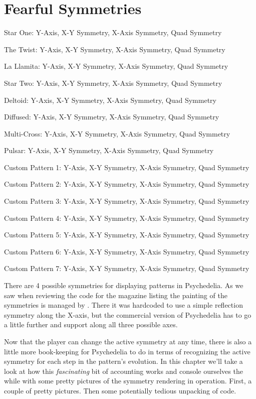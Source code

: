 \chapter{Fearful Symmetries} 
\label{sec:symmetries}
\lstset{style=6502Style}

\newcommand\addItem[2]%
{
  \expandafter\def\csname row:#1\endcsname{#2}%
}

\newcommand\showItem[1]%
{\expandafter\csname row:#1\endcsname}


\newcommand\getItem[1]%
{\noindent
  \text{\showItem{#1}}
  \par
}
\addItem{0}{Star One: Y-Axis, X-Y Symmetry, X-Axis Symmetry, Quad Symmetry}
\addItem{1}{The Twist: Y-Axis, X-Y Symmetry, X-Axis Symmetry, Quad Symmetry}
\addItem{2}{La Llamita: Y-Axis, X-Y Symmetry, X-Axis Symmetry, Quad Symmetry}
\addItem{3}{Star Two: Y-Axis, X-Y Symmetry, X-Axis Symmetry, Quad Symmetry}
\addItem{4}{Deltoid: Y-Axis, X-Y Symmetry, X-Axis Symmetry, Quad Symmetry}
\addItem{5}{Diffused: Y-Axis, X-Y Symmetry, X-Axis Symmetry, Quad Symmetry}
\addItem{6}{Multi-Cross: Y-Axis, X-Y Symmetry, X-Axis Symmetry, Quad Symmetry}
\addItem{7}{Pulsar: Y-Axis, X-Y Symmetry, X-Axis Symmetry, Quad Symmetry}
\addItem{8}{Custom Pattern 1: Y-Axis, X-Y Symmetry, X-Axis Symmetry, Quad Symmetry}
\addItem{9}{Custom Pattern 2: Y-Axis, X-Y Symmetry, X-Axis Symmetry, Quad Symmetry}
\addItem{10}{Custom Pattern 3: Y-Axis, X-Y Symmetry, X-Axis Symmetry, Quad Symmetry}
\addItem{11}{Custom Pattern 4: Y-Axis, X-Y Symmetry, X-Axis Symmetry, Quad Symmetry}
\addItem{12}{Custom Pattern 5: Y-Axis, X-Y Symmetry, X-Axis Symmetry, Quad Symmetry}
\addItem{13}{Custom Pattern 6: Y-Axis, X-Y Symmetry, X-Axis Symmetry, Quad Symmetry}
\addItem{14}{Custom Pattern 7: Y-Axis, X-Y Symmetry, X-Axis Symmetry, Quad Symmetry}

There are 4 possible symmetries for displaying patterns in Psychedelia. As we saw when
reviewing the code for the magazine listing the painting of the symmetries is managed
by . There it was hardcoded to use a simple
reflection symmetry along the X-axis, but the commercial version of Psychedelia has to
go a little further and support along all three possible axes. 

Now that the player can change the active symmetry at any time, there is also a little more
book-keeping for Psychedelia to do in terms of recognizing the active symmetry for each
step in the pattern's evolution. In this chapter we'll take a look at how this 
\textit{fascinating} bit of accounting works and console ourselves the while with some
pretty pictures of the symmetry rendering in operation. First, a couple of pretty pictures.
Then some potentially tedious unpacking of code.

